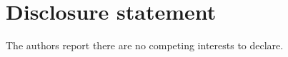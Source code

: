 \documentclass[preprint,review,11pt,authoryear]{elsarticle}
\begin{document}


\section*{Disclosure statement}
The authors report there are no competing interests to declare.




\end{document}
